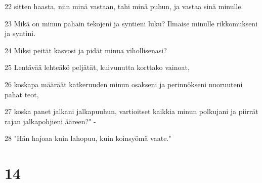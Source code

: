 \par 22 sitten haasta, niin minä vastaan, tahi minä puhun, ja vastaa sinä minulle.
\par 23 Mikä on minun pahain tekojeni ja syntieni luku? Ilmaise minulle rikkomukseni ja syntini.
\par 24 Miksi peität kasvosi ja pidät minua vihollisenasi?
\par 25 Lentävää lehteäkö peljätät, kuivunutta korttako vainoat,
\par 26 koskapa määräät katkeruuden minun osakseni ja perinnökseni nuoruuteni pahat teot,
\par 27 koska panet jalkani jalkapuuhun, vartioitset kaikkia minun polkujani ja piirrät rajan jalkapohjieni ääreen?" -
\par 28 "Hän hajoaa kuin lahopuu, kuin koinsyömä vaate."

\chapter{14}

